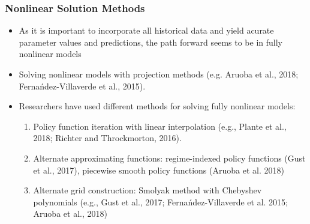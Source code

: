\documentclass[11pt]{beamer}
\begin{document}
\begin{frame}\frametitle{Nonlinear Solution Methods}
\begin{itemize}\setlength{\itemsep}{10pt}
	\item  As it is important to incorporate all historical data and yield acurate parameter values and predictions, the path forward seems to be in fully nonlinear models
	\item Solving nonlinear models with projection methods (e.g. Aruoba et al., 2018; Ferna\'ndez-Villaverde et al., 2015).
	\item  Researchers have used different methods for solving fully nonlinear models:
	\begin{enumerate} \setlength{\itemsep}{4pt}
		\item  Policy function iteration with linear interpolation (e.g., Plante et al., 2018; Richter and Throckmorton, 2016).
		\item  Alternate approximating functions: regime-indexed policy functions (Gust et al., 2017), piecewise smooth policy functions (Aruoba et al. 2018)
		\item  Alternate grid construction: Smolyak method with Chebyshev polynomials (e.g., Gust et al., 2017; Ferna\'ndez-Villaverde et al. 2015; Aruoba et al., 2018)
	\end{enumerate}
\end{itemize}
\end{frame}
\end{document}
